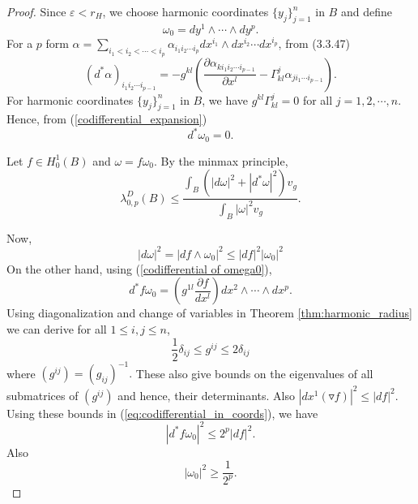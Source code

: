 \documentclass[10 pt, reqno]{amsart}
\begin{document}
\begin{proof}
Since $\varepsilon<r_H$, we choose  harmonic coordinates $\{y_j\}_{j=1}^n$ in $B$ and  define
\[
\omega_0 = dy^{1}\wedge\cdots\wedge dy^{p}.
\]
For a $p$ form $\alpha=\sum_{i_1<i_2<\cdots <i_{p}}\alpha_{i_1i_2\cdots  i_{p}}dx^{i_1}\wedge dx^{i_2}\cdots dx^{i_{p}}$, from (3.3.47) \cite{jost}
\begin{equation}
\label{codifferential_expansion}
    \left(d^*\alpha\right)_{i_1i_2\cdots i_{p-1}}=-g^{kl}\left(\frac{\partial \alpha_{ki_1i_2\cdots i_{p-1}}}{\partial x^l}-\Gamma^j_{kl}\alpha_{ji_1\cdots i_{p-1}}\right).
\end{equation}
For harmonic coordinates $\{y_j\}_{j=1}^n$ in $B$,  we have $g^{kl}\Gamma_{kl}^j=0$ for all $j=1,2,\cdots,n$. Hence, from (\ref{codifferential_expansion}) 
\begin{equation}
    \label{codifferential of omega0}
    d^*\omega_0=0.
\end{equation}

Let $f\in H^1_0(B)$ and $\omega=f\omega_0$. By the minmax principle,
\begin{equation}
    \label{eq:rayleigh_quotient_dirichlet}
    \lambda_{0,p}^{D}(B)\le \frac{\int_{B} (|d\omega|^2+|d^*\omega|^2)v_g}{\int_{B}|\omega|^2 v_g}.
\end{equation}

Now, \begin{equation} \label{eq:domegabound}
 |d\omega|^2=|df\wedge\omega_0|^2\le |df|^2|\omega_0|^2
\end{equation}
On the other hand, using (\ref{codifferential of omega0}), 
\begin{equation}
\label{eq:codifferential_in_coords}
    d^*f\omega_0= \left(g^{1l}\frac{\partial f}{dx^l}\right)dx^2\wedge \cdots\wedge dx^p.
\end{equation}
Using diagonalization and change of variables in Theorem \ref{thm:harmonic_radius} we can derive for all $1\le i,j\le n$,
\begin{equation}
 \frac{1}{2}\delta_{ij}\le g^{ij}\le 2\delta_{ij} \nonumber
\end{equation}
where $(g^{ij})=(g_{ij})^{-1}.$ These also give bounds on the eigenvalues of all submatrices of $(g^{ij})$ and hence, their determinants. Also $|dx^1(\triangledown f)|^2\le |df|^2 .$
Using these bounds in (\ref{eq:codifferential_in_coords}), we have
\begin{equation}
    \label{eq:norm_codifferential_bound}
    |d^*f\omega_0|^2\le 2^{p}|df|^2.
\end{equation} 
Also 
\begin{equation}
  \label{eq:bound_on_norm_omega0}  
  |\omega_0|^2\ge \frac{1}{2^p}.
\end{equation}


\end{proof}
\end{document}
